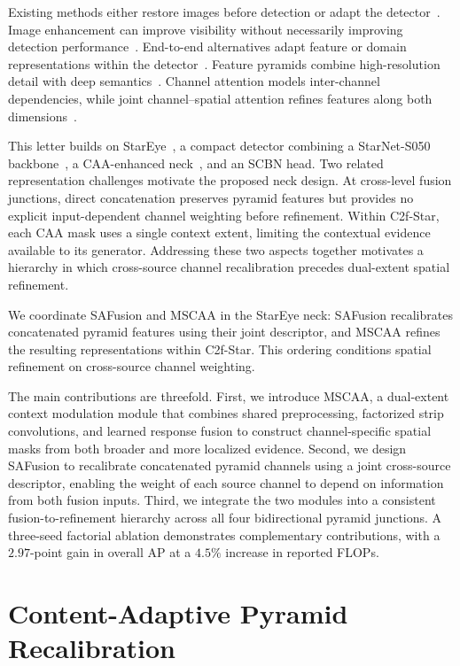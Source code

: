 \documentclass[letterpaper,10pt,conference]{ieeeconf}
\begin{document}
Existing methods either restore images before detection or adapt the
detector~\cite{ref_survey,ref_swipenet,ref_amspuod}.
Image enhancement can improve visibility without necessarily improving
detection performance~\cite{ref_uieb,ref_enhance1,ref_enhance2}.
End-to-end alternatives adapt feature or domain representations
within the detector~\cite{ref_e2e1,ref_e2e2}.
Feature pyramids combine high-resolution detail with deep
semantics~\cite{ref_fpn,ref_panet,ref_efficientdet}.
Channel attention models inter-channel dependencies, while joint
channel--spatial attention refines features along both
dimensions~\cite{ref_senet,ref_cbam}.

This letter builds on StarEye~\cite{ref_stareye}, a compact detector
combining a StarNet-S050 backbone~\cite{ref_starnet}, a CAA-enhanced
neck~\cite{ref_caa}, and an SCBN head. Two related representation challenges motivate the proposed neck design. At cross-level fusion junctions, direct concatenation preserves pyramid features but provides no explicit input-dependent channel weighting before refinement. Within C2f-Star, each CAA mask uses a single context extent, limiting the contextual evidence available to its generator. Addressing these two aspects together motivates a hierarchy in which cross-source channel recalibration precedes dual-extent spatial refinement.

We coordinate SAFusion and MSCAA in the StarEye neck: SAFusion recalibrates
concatenated pyramid features using their joint descriptor, and MSCAA refines
the resulting representations within C2f-Star. This ordering conditions
spatial refinement on cross-source channel weighting.

The main contributions are threefold. First, we introduce MSCAA, a dual-extent context modulation module that combines shared preprocessing, factorized strip convolutions, and learned response fusion to construct channel-specific spatial masks from both broader and more localized evidence. Second, we design SAFusion to recalibrate concatenated pyramid channels using a joint cross-source descriptor, enabling the weight of each source channel to depend on information from both fusion inputs. Third, we integrate the two modules into a consistent fusion-to-refinement hierarchy across all four bidirectional pyramid junctions. A three-seed factorial ablation demonstrates complementary contributions, with a \(2.97\)-point gain in overall AP at a \(4.5\%\) increase in reported FLOPs.

\section{Content-Adaptive Pyramid Recalibration}
\end{document}
